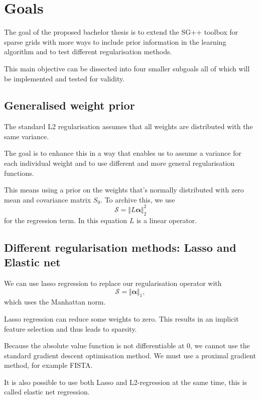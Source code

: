 \documentclass[11pt]{scrartcl}
\begin{document}
\section{Goals}
The goal of the proposed bachelor thesis is to extend the SG++ toolbox for sparse grids with more ways to include prior information
in the learning algorithm and to test different regularisation methods.

This main objective can be dissected into four smaller subgoals all of which will be implemented and tested for validity.

\subsection{Generalised weight prior}
The standard L2 regularisation assumes that all weights are distributed with the same variance. 

The goal is to enhance this in a way that enables us to assume a variance for
each individual weight and to use different and more general regularisation functions.

This means using a prior on the weights that's normally distributed with zero mean and covariance matrix \(S_0\).
To archive this, we use 
\begin{equation}
\mathcal{S} = \Vert L\bm{\alpha} \Vert_2^2
\end{equation}
for the regression term. In this equation \( L \) is a linear operator.

\subsection{Different regularisation methods: Lasso and Elastic net}
We can use lasso regression to replace our regularisation operator with 
\begin{equation}
\mathcal{S} = \Vert \bm{\alpha} \Vert_1,
\end{equation}
which uses the Manhattan norm.

Lasso regression can reduce some weights to zero. 
This results in an implicit feature selection and thus leads to sparsity.

Because the absolute value function is not differentiable at \(0\), we cannot use
the standard gradient descent optimisation method.
We must use a proximal gradient method, for example FISTA.

It is also possible to use both Lasso and L2-regression at the same time, this is called elastic net regression.
\end{document}
